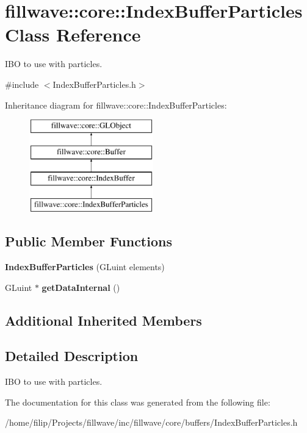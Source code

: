 \hypertarget{classfillwave_1_1core_1_1IndexBufferParticles}{}\section{fillwave\+:\+:core\+:\+:Index\+Buffer\+Particles Class Reference}
\label{classfillwave_1_1core_1_1IndexBufferParticles}


I\+B\+O to use with particles.  




{\ttfamily \#include $<$Index\+Buffer\+Particles.\+h$>$}

Inheritance diagram for fillwave\+:\+:core\+:\+:Index\+Buffer\+Particles\+:\begin{figure}[H]
\begin{center}
\leavevmode
\includegraphics[height=4.000000cm]{classfillwave_1_1core_1_1IndexBufferParticles}
\end{center}
\end{figure}
\subsection*{Public Member Functions}
\begin{DoxyCompactItemize}
\item 
\hypertarget{classfillwave_1_1core_1_1IndexBufferParticles_a8b4f3f8f009acc1f253eee32d85e74c4}{}{\bfseries Index\+Buffer\+Particles} (G\+Luint elements)\label{classfillwave_1_1core_1_1IndexBufferParticles_a8b4f3f8f009acc1f253eee32d85e74c4}

\item 
\hypertarget{classfillwave_1_1core_1_1IndexBufferParticles_aef693f4fd505ec973a6270a6038de07a}{}G\+Luint $\ast$ {\bfseries get\+Data\+Internal} ()\label{classfillwave_1_1core_1_1IndexBufferParticles_aef693f4fd505ec973a6270a6038de07a}

\end{DoxyCompactItemize}
\subsection*{Additional Inherited Members}


\subsection{Detailed Description}
I\+B\+O to use with particles. 

The documentation for this class was generated from the following file\+:\begin{DoxyCompactItemize}
\item 
/home/filip/\+Projects/fillwave/inc/fillwave/core/buffers/Index\+Buffer\+Particles.\+h\end{DoxyCompactItemize}
